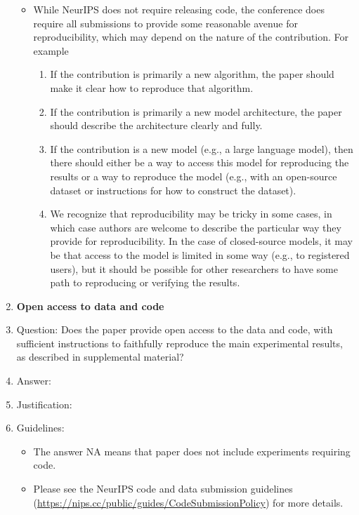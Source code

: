 \documentclass{article}
\begin{document}
\begin{enumerate}
\begin{itemize}
            \item While NeurIPS does not require releasing code, the conference does require all submissions to provide some reasonable avenue for reproducibility, which may depend on the nature of the contribution. For example
                \begin{enumerate}
                    \item If the contribution is primarily a new algorithm, the paper should make it clear how to reproduce that algorithm.
                    \item If the contribution is primarily a new model architecture, the paper should describe the architecture clearly and fully.
                    \item If the contribution is a new model (e.g., a large language model), then there should either be a way to access this model for reproducing the results or a way to reproduce the model (e.g., with an open-source dataset or instructions for how to construct the dataset).
                    \item We recognize that reproducibility may be tricky in some cases, in which case authors are welcome to describe the particular way they provide for reproducibility. In the case of closed-source models, it may be that access to the model is limited in some way (e.g., to registered users), but it should be possible for other researchers to have some path to reproducing or verifying the results.
                \end{enumerate}
        \end{itemize}
        \item {\bf Open access to data and code}
    \item[] Question: Does the paper provide open access to the data and code, with sufficient instructions to faithfully reproduce the main experimental results, as described in supplemental material?
    \item[] Answer: \answerTODO{} %
    \item[] Justification: \justificationTODO{}
    \item[] Guidelines:
        \begin{itemize}
            \item The answer NA means that paper does not include experiments requiring code.
            \item Please see the NeurIPS code and data submission guidelines (\url{https://nips.cc/public/guides/CodeSubmissionPolicy}) for more details.

\end{itemize}
\end{enumerate}
\end{document}
